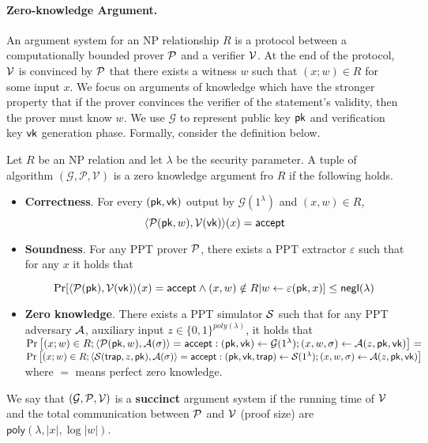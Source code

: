 \paragraph{Zero-knowledge Argument.} An argument system for an NP relationship $R$ is a protocol between a computationally bounded prover $\P$ and a verifier $\V$. At the end of the protocol, $\V$ is convinced by $\P$ that there exists a witness $w$ such that $(x; w) \in R$ for some input $x$. We focus on arguments of knowledge which have the stronger property that if the prover convinces the verifier of the statement’s validity, then the prover must know $w$. We use $\mathcal{G}$ to represent public key $\pk$ and verification key $\vk$ generation phase. Formally, consider the definition below.

\begin{definition}\label{def::zkp}
	
	Let $R$ be an NP relation and let $\lambda$ be the security parameter. A tuple of algorithm $(\mathcal{G}, \mathcal{P}, \mathcal{V})$ is a zero knowledge argument fro $R$ if the following holds.
	
	\begin{itemize}
		
		\item \textbf{Correctness}. For every $(\pk, \vk)$ output by $\mathcal{G}(1^\lambda)$ and $(x, w) \in R$, 
		$$\langle \P(\pk, w), \V(\vk) \rangle(x) = \accept$$
		
		\item \textbf{Soundness}. For any PPT prover $\P$, there exists a PPT extractor $\varepsilon$ such that for any $x$ it holds that
		
		$$\Pr[\langle\P(\pk), \V(\vk) \rangle(x) = \accept \wedge (x, w) \notin R | w \leftarrow \varepsilon(\pk, x)] \leq \neg(\lambda)$$
		
		\item \textbf{Zero knowledge}. There exists a PPT simulator $\S$ such that for any PPT adversary $\A$, auxiliary input $z \in \{0, 1\}^{poly(\lambda)}$, it holds that\\
		{\scriptsize
		$\Pr\left[(x;w)\in R; \langle\P(\pk,w),\A(\sigma) \rangle=\accept: (\pk,\vk)\leftarrow\mathcal{G}(1^\lambda); (x,w,\sigma)\leftarrow\A(z,\pk,\vk) \right] = $\\
		$\Pr\left[(x;w)\in R; \langle\S(\mathsf{trap}, z, \pk),\A(\sigma) \rangle=\accept:(\pk,\vk,\mathsf{trap})\leftarrow\S(1^\lambda); (x,w,\sigma)\leftarrow\A(z,\pk,\vk)\right]$\\
		}
		where $=$ means perfect zero knowledge. 
		
	\end{itemize}
	We say that $(\mathcal{G},\P,\V)$ is a \textbf{succinct} argument system if the
	running time of $\V$ and the total communication between $\P$ and $\V$ (proof size) are $\mathsf{poly}(\lambda,|x|,\log|w|)$.
\end{definition}



